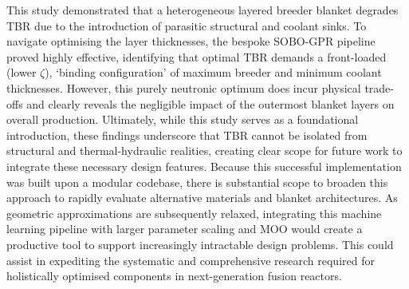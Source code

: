 \documentclass[11pt]{article}
\begin{document}
This study demonstrated that a heterogeneous layered breeder blanket degrades TBR due to the
introduction of parasitic structural and coolant sinks. To navigate optimising the layer
thicknesses, the bespoke SOBO-GPR pipeline proved highly effective, identifying that optimal TBR
demands a front-loaded (lower $\zeta$), `binding configuration' of maximum breeder and minimum
coolant thicknesses. However, this purely neutronic optimum does incur physical trade-offs and
clearly reveals the negligible impact of the outermost blanket layers on overall production.
Ultimately, while this study serves as a foundational introduction, these findings underscore that
TBR cannot be isolated from structural and thermal-hydraulic realities, creating clear scope for
future work to integrate these necessary design features. Because this successful implementation was
built upon a modular codebase, there is substantial scope to broaden this approach to rapidly
evaluate alternative materials and blanket architectures. As geometric approximations are
subsequently relaxed, integrating this machine learning pipeline with larger parameter scaling and
MOO would create a productive tool to support increasingly intractable design problems. This could
assist in expediting the systematic and comprehensive research required for holistically optimised
components in next-generation fusion reactors.



\printbibliography[heading=bibintoc, title={References}]
\end{document}
